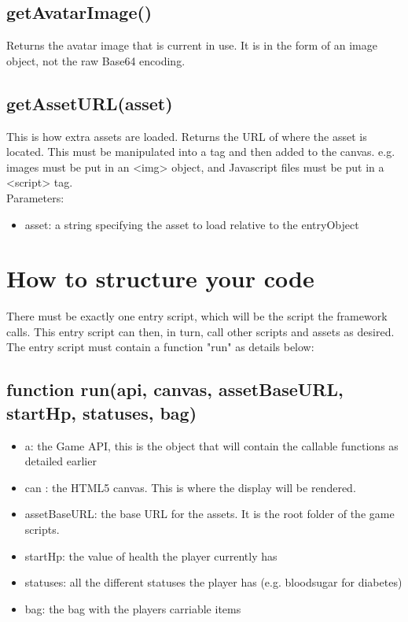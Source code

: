 \documentclass[a4paper,12pt]{article}
\begin{document}
\subsection*{getAvatarImage()}
Returns the avatar image that is current in use. It is in the form of an image object, not the raw Base64 encoding.

\subsection*{getAssetURL(asset)}
This is how extra assets are loaded. Returns the URL of where the asset is located. This must be manipulated into a tag
and then added to the canvas. e.g. images must be put in an <img> object, and Javascript files must be put in
a <script> tag.\\
Parameters:
\begin{itemize}
	\setlength\itemsep{0em}
	\item asset: a string specifying the asset to load relative to the entryObject
\end{itemize}	

\section{How to structure your code}
There must be exactly one entry script, which will be the script the framework calls. This entry script
can then, in turn, call other scripts and assets as desired. The entry script must contain a function "run"
as details below:

\subsection*{function run(api, canvas, assetBaseURL, startHp, statuses, bag)}
\begin{itemize}
	\setlength\itemsep{0em}
	\item a: 			the Game API, this is the object that will contain the callable functions as detailed earlier
	\item can : 			the HTML5 canvas. This is where the display will be rendered.
	\item assetBaseURL:	the base URL for the assets. It is the root folder of the game scripts.
	\item startHp:		the value of health the player currently has
	\item statuses:		all the different statuses the player has (e.g. bloodsugar for diabetes)
	\item bag:			the bag with the players carriable items
\end{itemize}
\end{document}
